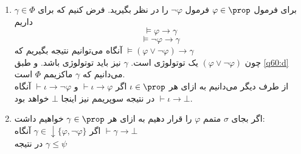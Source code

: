\begin{ans}
\begin{enumerate}[label=(\alph*)]
        \item\label{q60:e} 
        برای فرمول 
        $\varphi\in\prop$
        فرمول 
        $\neg\varphi$
        را در نظر بگیرید. 
        فرض کنیم که برای 
        $\gamma\in\Phi$
        داریم 
        \[\models\varphi\to\gamma\]
        \[\models\neg\varphi\to\gamma\]
        آنگاه می‌توانیم نتیجه بگیریم که 
        $\models(\varphi\vee\neg\varphi)\to\gamma$
        \\
        چون 
        $(\varphi\vee\neg\varphi)$
        یک توتولوژی است. 
        $\gamma$
        نیز باید توتولوژی باشد. و طبق \ref{q60:d} می‌دانیم که 
        $\gamma$
        ماکزیمم
        $\Phi$
        است.
        \\
        از طرف دیگر می‌دانیم به ازای هر 
        $\iota\in\prop$
        اگر 
        $\vdash\iota\to\varphi$
        و
        $\vdash\iota\to\neg\varphi$
        آنگاه
        $\vdash\iota\to\bot$
        در نتیجه سوپریمم نیز اینجا 
        $\bot$
        خواهد بود.

        \item\label{q60:f} 
        اگر بجای
        $\sigma$
        متمم 
        $\varphi$
        را قرار دهیم به ازای هر 
        $\gamma\in\prop$
        خواهیم داشت:
        \\
        اگر 
        $\gamma\in\downarrow\{\varphi,\neg\varphi\}$
        آنگاه
        $\vdash\gamma\to\bot$
        \\
        در نتیجه 
        $\gamma\leq\psi$
    \end{enumerate}
\end{ans}
